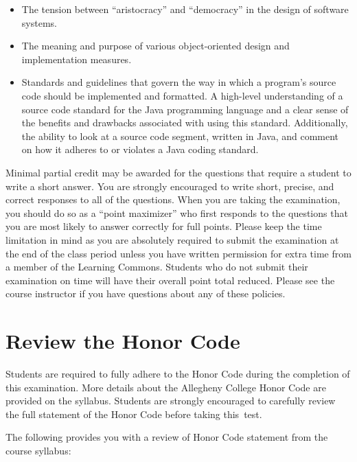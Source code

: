 \begin{itemize}
  \item The tension between ``aristocracy'' and ``democracy'' in the design of software systems.

  \item The meaning and purpose of various object-oriented design and implementation measures.

  \item Standards and guidelines that govern the way in which a program's source code should be implemented and
    formatted. A high-level understanding of a source code standard for the Java programming language and a clear sense
    of the benefits and drawbacks associated with using this standard. Additionally, the ability to look at a source
    code segment, written in Java, and comment on how it adheres to or violates a Java coding standard.

\end{itemize}

\vspace*{-.05in}
\noindent Minimal partial credit may be awarded for the questions that require a student to write a short answer. You
are strongly encouraged to write short, precise, and correct responses to all of the questions. When you are taking the
examination, you should do so as a ``point maximizer'' who first responds to the questions that you are most likely to
answer correctly for full points. Please keep the time limitation in mind as you are absolutely required to submit the
examination at the end of the class period unless you have written permission for extra time from a member of the
Learning Commons. Students who do not submit their examination on time will have their overall point total reduced.
Please see the course instructor if you have questions about any of these policies.

\vspace*{-.1in}
\section*{Review the Honor Code}
\vspace*{-.06in}

\noindent Students are required to fully adhere to the Honor Code during the completion of this examination. More
details about the Allegheny College Honor Code are provided on the syllabus. Students are strongly encouraged to
carefully review the full statement of the Honor Code before taking \mbox{this test}.

\noindent The following provides you with a review of Honor Code statement from the course syllabus:

